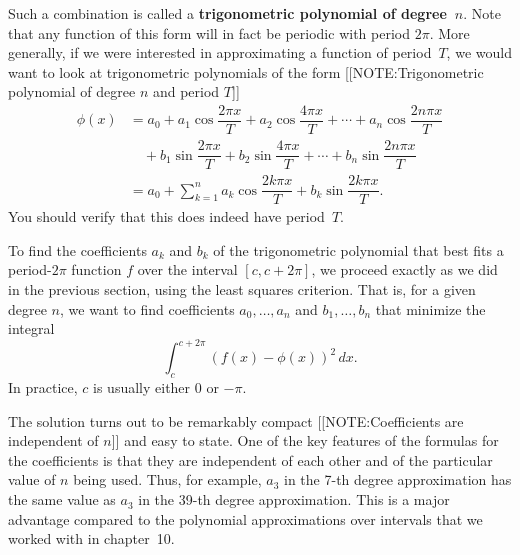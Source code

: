 Such a combination is called a {\bf trigonometric polynomial of
  \boldmath degree~$n$}.  Note that
any function of this form will in fact be periodic with period $2\pi$.
More generally, if we were interested in approximating a function of
period~$T$, we would want to look at trigonometric polynomials of the
form 
[[NOTE:Trigonometric polynomial of degree $n$ and period $T$]]
\begin{align*}
\phi(x) &= a_0 +a_1 \cos\dfrac{2\pi x}{T}+ a_2 \cos\dfrac{4\pi x}{T} 
        + \cdots+ a_n \cos\dfrac{2n\pi x}{T} \\
 & \mbox{}\quad +b_1 \sin\dfrac{2\pi x}{T}+ b_2 \sin\dfrac{4\pi x}{T} 
        + \cdots+ b_n \sin\dfrac{2n\pi x}{T} \\
 &= a_0+\sum_{k=1}^n a_k \cos\dfrac{2k\pi x}{T} 
        + b_k \sin\dfrac{2k\pi x}{T}.
\end{align*}
You should verify that this does indeed have period~$T$.

To find the coefficients $a_k$ and $b_k$ of the trigonometric
polynomial that best fits a period-$2 \pi$ function $f$ over the
interval $[c, c + 2 \pi]$, we proceed exactly as we did in the
previous section, using the least squares criterion.  That is, for a
given degree $n$, we want to find coefficients $a_0, \ldots , a_n$ and
$b_1, \ldots , b_n$ that minimize the integral
\[
\int_c^{c+2\pi} \left( f(x) -\phi (x)\right)^2\, dx.
\] 
In practice, $c$ is usually either 0 or $-\pi$.

The solution turns out to be remarkably compact 
[[NOTE:Coefficients are independent of $n$]] 
and easy to state. One of the key features of the formulas for the
coefficients is that they are independent of each other and of the
particular value of $n$ being used.  Thus, for example, $a_3$ in the
7-th degree approximation has the same value as $a_3$ in the 39-th
degree approximation.  This is a major advantage compared to the
polynomial approximations over intervals that we worked with in
chapter~10.



\begin{center}\label{fourforms}
\end{center}



